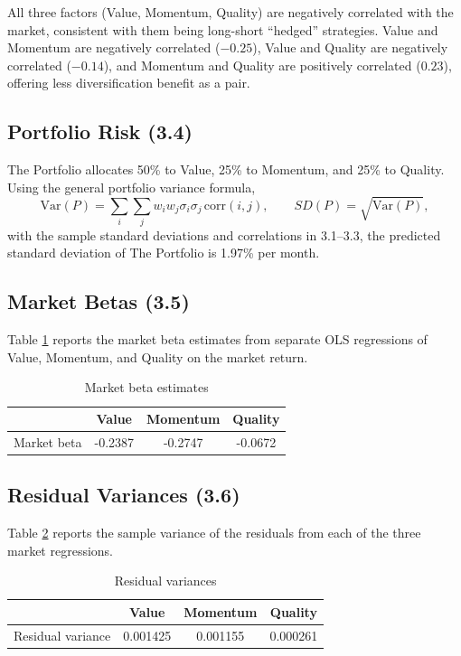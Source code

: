 \documentclass[11pt]{article}
\begin{document}
All three factors (Value, Momentum, Quality) are negatively correlated with the market, consistent with them being long-short ``hedged'' strategies. Value and Momentum are negatively correlated ($-0.25$), Value and Quality are negatively correlated ($-0.14$), and Momentum and Quality are positively correlated ($0.23$), offering less diversification benefit as a pair.

\subsection{Portfolio Risk (3.4)}

The Portfolio allocates 50\% to Value, 25\% to Momentum, and 25\% to Quality. Using the general portfolio variance formula,
\[
\text{Var}(P) = \sum_i \sum_j w_i w_j \sigma_i \sigma_j \, \text{corr}(i,j), \qquad SD(P) = \sqrt{\text{Var}(P)},
\]
with the sample standard deviations and correlations in 3.1--3.3, the predicted standard deviation of The Portfolio is 1.97\% per month.

\subsection{Market Betas (3.5)}

Table \ref{tab:betas} reports the market beta estimates from separate OLS regressions of Value, Momentum, and Quality on the market return.

\begin{table}[h]
\centering
\caption{Market beta estimates}
\label{tab:betas}
\begin{tabular}{lccc}
\toprule
 & Value & Momentum & Quality \\
\midrule
Market beta & -0.2387 & -0.2747 & -0.0672 \\
\bottomrule
\end{tabular}
\end{table}

\subsection{Residual Variances (3.6)}

Table \ref{tab:residvar} reports the sample variance of the residuals from each of the three market regressions.

\begin{table}[h]
\centering
\caption{Residual variances}
\label{tab:residvar}
\begin{tabular}{lccc}
\toprule
 & Value & Momentum & Quality \\
\midrule
Residual variance & 0.001425 & 0.001155 & 0.000261 \\
\bottomrule
\end{tabular}
\end{table}
\end{document}

